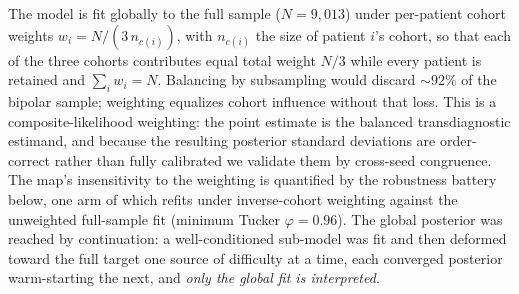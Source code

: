 The model is fit globally to the full sample ($N=9{,}013$) under per-patient cohort weights
$w_i = N/(3\,n_{c(i)})$, with $n_{c(i)}$ the size of patient $i$'s cohort, so that each of the
three cohorts contributes equal total weight $N/3$ while every patient is retained and
$\sum_i w_i = N$. Balancing by subsampling would discard ${\sim}92\%$ of the bipolar sample; weighting equalizes cohort influence without that loss. This is a
composite-likelihood weighting: the point estimate is the balanced transdiagnostic estimand, and because the
resulting posterior standard deviations are order-correct rather than fully calibrated we validate them by
cross-seed congruence. The map's insensitivity to the weighting is quantified by the robustness battery below,
one arm of which refits under inverse-cohort weighting against the unweighted full-sample fit (minimum Tucker
$\varphi=0.96$). The global posterior was reached by continuation: a
well-conditioned sub-model was fit and then deformed toward the full target one source of
difficulty at a time, each converged posterior warm-starting the next, and \emph{only the
global fit is interpreted}.

